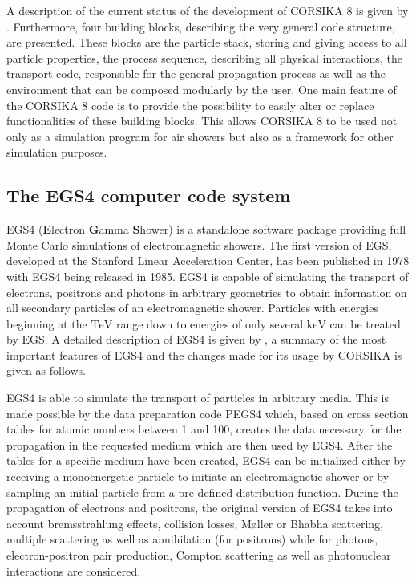 A description of the current status of the development of CORSIKA 8 is given by \cite{corsika8}.
Furthermore, four building blocks, describing the very general code structure, are presented.
These blocks are the particle stack, storing and giving access to all particle properties, the process sequence, describing all physical interactions, the transport code, responsible for the general propagation process as well as the environment that can be composed modularly by the user.
One main feature of the CORSIKA 8 code is to provide the possibility to easily alter or replace functionalities of these building blocks.
This allows CORSIKA 8 to be used not only as a simulation program for air showers but also as a framework for other simulation purposes.


\subsection{The EGS4 computer code system}
\label{sec:egs4}

EGS4 (\textbf{E}lectron \textbf{G}amma \textbf{S}hower) is a standalone software package providing full Monte Carlo simulations of electromagnetic showers.
The first version of EGS, developed at the Stanford Linear Acceleration Center, has been published in 1978 with EGS4 being released in 1985.
EGS4 is capable of simulating the transport of electrons, positrons and photons in arbitrary geometries to obtain information on all secondary particles of an electromagnetic shower.
Particles with energies beginning at the $\si{\tera\electronvolt}$ range down to energies of only several $\si{\kilo\electronvolt}$ can be treated by EGS.
A detailed description of EGS4 is given by \cite{egs4}, a summary of the most important features of EGS4 and the changes made for its usage by CORSIKA is given as follows.

EGS4 is able to simulate the transport of particles in arbitrary media.
This is made possible by the data preparation code PEGS4 which, based on cross section tables for atomic numbers between 1 and 100, creates the data necessary for the propagation in the requested medium which are then used by EGS4.
After the tables for a specific medium have been created, EGS4 can be initialized either by receiving a monoenergetic particle to initiate an electromagnetic shower or by sampling an initial particle from a pre-defined distribution function.
During the propagation of electrons and positrons, the original version of EGS4 takes into account bremsstrahlung effects, collision losses, M{\o}ller or Bhabha scattering, multiple scattering as well as annihilation (for positrons) while for photons, electron-positron pair production, Compton scattering as well as photonuclear interactions are considered.

